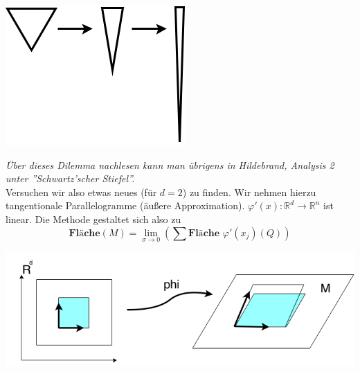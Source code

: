 \begin{center}
	\includegraphics[scale=0.5]{pictures/003-05.png}
\end{center}
\emph{Über dieses Dilemma nachlesen kann man übrigens in Hildebrand, Analysis 2 unter ''Schwartz'scher Stiefel''.}\\
\linebreak
Versuchen wir also etwas neues (für $d=2$) zu finden. Wir nehmen hierzu tangentionale Parallelogramme (äußere Approximation).
$\varphi'(x):\mathbb{R}^d\rightarrow\mathbb{R}^n$ ist linear. Die Methode gestaltet sich also zu
\begin{equation*}
\textbf{Fläche}(M)=\lim\limits_{\sigma\rightarrow 0}\left(\sum\textbf{Fläche\ }\varphi'(x_j)(Q)\right)
\end{equation*}
\begin{center}
	\includegraphics[scale=0.5]{pictures/003-06.png}
\end{center}